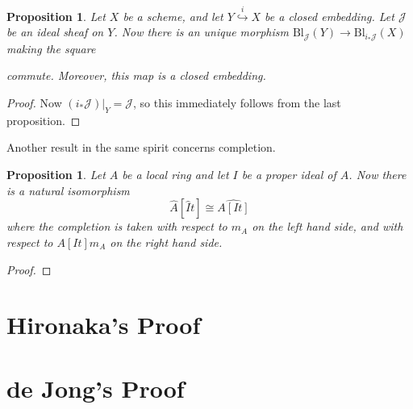 \documentclass[12pt,a4paper,leqno]{article}
\newcommand{\bl}{\mathrm{Bl}}
\theoremstyle{plain}
\newtheorem{prop}[theo]{Proposition}
\theoremstyle{definition}
\theoremstyle{remark}
\begin{document}
\begin{prop}
Let $X$ be a scheme, and let $Y \stackrel{i}{\hookrightarrow} X$ be a closed embedding. Let $\mathscr{J}$ be an ideal sheaf on $Y$. Now there is an unique morphism $\bl_{\mathscr{J}}(Y) \to \bl_{i_*\mathscr{J}}(X)$ making the square
\begin{center}
\end{center}
commute. Moreover, this map is a closed embedding.
\end{prop}
\begin{proof}
Now $(i_*\mathscr{J})|_Y = \mathscr{J}$, so this immediately follows from the last proposition.
\end{proof}

Another result in the same spirit concerns completion.

\begin{prop}
Let $A$ be a local ring and let $I$ be a proper ideal of $A$. Now there is a natural isomorphism
\begin{equation*}
\widehat{A} [\widehat{I}t] \cong \widehat{A[It]}
\end{equation*}
where the completion is taken with respect to $m_A$ on the left hand side, and with respect to $A[It] m_A$ on the right hand side.
\end{prop}
\begin{proof}

\end{proof}

\section{Hironaka's Proof}\label{HirRes}

\section{de Jong's Proof}\label{deJongRes}
\end{document}
